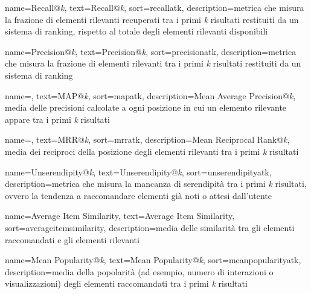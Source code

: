  {
    name=Recall@\emph{k},
    text=Recall@\emph{k},
    sort=recallatk,
    description={metrica che misura la frazione di elementi rilevanti recuperati tra i primi \emph{k} risultati restituiti da un sistema di ranking, rispetto al totale degli elementi rilevanti disponibili}
}

 {
    name=Precision@\emph{k},
    text=Precision@\emph{k},
    sort=precisionatk,
    description={metrica che misura la frazione di elementi rilevanti tra i primi \emph{k} risultati restituiti da un sistema di ranking}
}

 {
    name=,
    text=MAP@\emph{k},
    sort=mapatk,
    description={Mean Average Precision@\emph{k}, media delle precisioni calcolate a ogni posizione in cui un elemento rilevante appare tra i primi \emph{k} risultati}
}

 {
    name=,
    text=MRR@\emph{k},
    sort=mrratk,
    description={Mean Reciprocal Rank@\emph{k}, media dei reciproci della posizione degli elementi rilevanti tra i primi \emph{k} risultati}
}

 {
    name=Unserendipity@\emph{k},
    text=Unserendipity@\emph{k},
    sort=unserendipityatk,
    description={metrica che misura la mancanza di serendipità tra i primi \emph{k} risultati, ovvero la tendenza a raccomandare elementi già noti o attesi dall'utente}
}

 {
    name=Average Item Similarity,
    text=Average Item Similarity,
    sort=averageitemsimilarity,
    description={media delle similarità tra gli elementi raccomandati e gli elementi rilevanti}
}

 {
    name=Mean Popularity@\emph{k},
    text=Mean Popularity@\emph{k},
    sort=meanpopularityatk,
    description={media della popolarità (ad esempio, numero di interazioni o visualizzazioni) degli elementi raccomandati tra i primi \emph{k} risultati}
}
